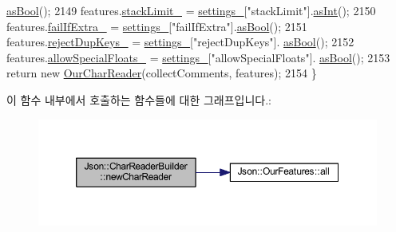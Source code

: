 \begin{DoxyCode}
      \hyperlink{class_json_1_1_value_ab693fb7b9b1595bb0adc49658bbf780d}{asBool}();
2149   features.\hyperlink{class_json_1_1_our_features_a9a786713902d14be6d57a08cc03ccfff}{stackLimit\_} = \hyperlink{class_json_1_1_char_reader_builder_ac69b7911ad64c171c51ebaf2ea26d958}{settings\_}[\textcolor{stringliteral}{"stackLimit"}].\hyperlink{class_json_1_1_value_a614d635bc248a592593feb322cd15ab8}{asInt}();
2150   features.\hyperlink{class_json_1_1_our_features_ae8ad25b90706c78f1a8fe929191ac61b}{failIfExtra\_} = \hyperlink{class_json_1_1_char_reader_builder_ac69b7911ad64c171c51ebaf2ea26d958}{settings\_}[\textcolor{stringliteral}{"failIfExtra"}].\hyperlink{class_json_1_1_value_ab693fb7b9b1595bb0adc49658bbf780d}{asBool}();
2151   features.\hyperlink{class_json_1_1_our_features_a39b8e0b86b1c24a45e800c023bb715aa}{rejectDupKeys\_} = \hyperlink{class_json_1_1_char_reader_builder_ac69b7911ad64c171c51ebaf2ea26d958}{settings\_}[\textcolor{stringliteral}{"rejectDupKeys"}].
      \hyperlink{class_json_1_1_value_ab693fb7b9b1595bb0adc49658bbf780d}{asBool}();
2152   features.\hyperlink{class_json_1_1_our_features_af760f91cc2a7af37e44f78fb466061bb}{allowSpecialFloats\_} = \hyperlink{class_json_1_1_char_reader_builder_ac69b7911ad64c171c51ebaf2ea26d958}{settings\_}[\textcolor{stringliteral}{"allowSpecialFloats"}].
      \hyperlink{class_json_1_1_value_ab693fb7b9b1595bb0adc49658bbf780d}{asBool}();
2153   \textcolor{keywordflow}{return} \textcolor{keyword}{new} \hyperlink{class_json_1_1_our_char_reader}{OurCharReader}(collectComments, features);
2154 \}
\end{DoxyCode}
이 함수 내부에서 호출하는 함수들에 대한 그래프입니다.\+:\nopagebreak
\begin{figure}[H]
\begin{center}
\leavevmode
\includegraphics[width=350pt]{class_json_1_1_char_reader_builder_a3a262fcc76c1eb8eebfd4718fb4e9722_cgraph}
\end{center}
\end{figure}
\mbox{\label{class_json_1_1_char_reader_builder_a84b35ef443340c06c0aa7b47851d8d86}} 
